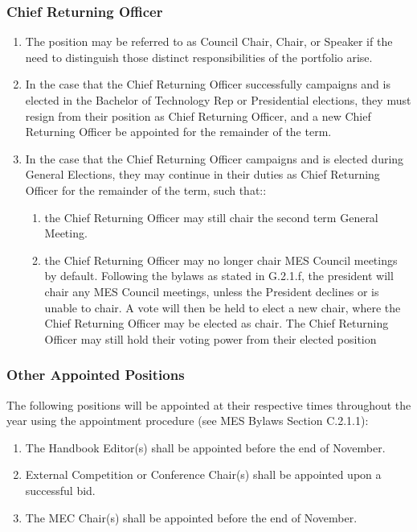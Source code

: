 \hypertarget{chief-returning-officer-1}{%
 \subsubsection{Chief Returning
  Officer}
 \label{chief-returning-officer-1}}
\begin{enumerate}
 \item
  The position may be referred to as Council Chair, Chair, or Speaker if
  the need to distinguish those distinct responsibilities of the
  portfolio arise.
 \item
  In the case that the Chief Returning Officer successfully campaigns
  and is elected in the Bachelor of Technology Rep or Presidential
  elections, they must resign from their position as Chief Returning
  Officer, and a new Chief Returning Officer be appointed for the
  remainder of the term.
 \item
  In the case that the Chief Returning Officer campaigns and is elected
  during General Elections, they may continue in their duties as Chief
  Returning Officer for the remainder of the term, such that::

  \begin{enumerate}
   \item
    the Chief Returning Officer may still chair the second term General
    Meeting.
   \item
    the Chief Returning Officer may no longer chair MES Council meetings
    by default. Following the bylaws as stated in G.2.1.f, the president
    will chair any MES Council meetings, unless the President declines
    or is unable to chair. A vote will then be held to elect a new
    chair, where the Chief Returning Officer may be elected as chair.
    The Chief Returning Officer may still hold their voting power from
    their elected position
  \end{enumerate}
\end{enumerate}

\hypertarget{other-appointed-positions}{%
 \subsubsection{Other Appointed
  Positions}
 \label{other-appointed-positions}}
The following positions will be appointed at their respective times
throughout the year using the appointment procedure (see MES Bylaws
Section C.2.1.1):

\begin{enumerate}
 \item
  The Handbook Editor(s) shall be appointed before the end of November.
 \item
  External Competition or Conference Chair(s) shall be appointed upon a
  successful bid.
 \item
  The MEC Chair(s) shall be appointed before the end of November.
\end{enumerate}
% 
